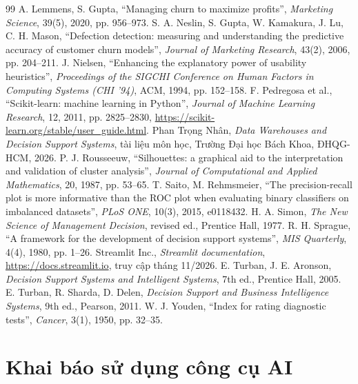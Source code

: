 \begin{thebibliography}{99}
 A. Lemmens, S. Gupta, ``Managing churn to maximize profits'', \textit{Marketing Science}, 39(5), 2020, pp. 956--973.
 S. A. Neslin, S. Gupta, W. Kamakura, J. Lu, C. H. Mason, ``Defection detection: measuring and understanding the predictive accuracy of customer churn models'', \textit{Journal of Marketing Research}, 43(2), 2006, pp. 204--211.
 J. Nielsen, ``Enhancing the explanatory power of usability heuristics'', \textit{Proceedings of the SIGCHI Conference on Human Factors in Computing Systems (CHI '94)}, ACM, 1994, pp. 152--158.
 F. Pedregosa et al., ``Scikit-learn: machine learning in Python'', \textit{Journal of Machine Learning Research}, 12, 2011, pp. 2825--2830, \url{https://scikit-learn.org/stable/user_guide.html}.
 Phan Trọng Nhân, \textit{Data Warehouses and Decision Support Systems}, tài liệu môn học, Trường Đại học Bách Khoa, ĐHQG-HCM, 2026.
 P. J. Rousseeuw, ``Silhouettes: a graphical aid to the interpretation and validation of cluster analysis'', \textit{Journal of Computational and Applied Mathematics}, 20, 1987, pp. 53--65.
 T. Saito, M. Rehmsmeier, ``The precision-recall plot is more informative than the ROC plot when evaluating binary classifiers on imbalanced datasets'', \textit{PLoS ONE}, 10(3), 2015, e0118432.
 H. A. Simon, \textit{The New Science of Management Decision}, revised ed., Prentice Hall, 1977.
 R. H. Sprague, ``A framework for the development of decision support systems'', \textit{MIS Quarterly}, 4(4), 1980, pp. 1--26.
 Streamlit Inc., \textit{Streamlit documentation}, \url{https://docs.streamlit.io}, truy cập tháng 11/2026.
 E. Turban, J. E. Aronson, \textit{Decision Support Systems and Intelligent Systems}, 7th ed., Prentice Hall, 2005.
 E. Turban, R. Sharda, D. Delen, \textit{Decision Support and Business Intelligence Systems}, 9th ed., Pearson, 2011.
 W. J. Youden, ``Index for rating diagnostic tests'', \textit{Cancer}, 3(1), 1950, pp. 32--35.
\end{thebibliography}

\vspace{1.2em}
\section*{Khai báo sử dụng công cụ AI}

